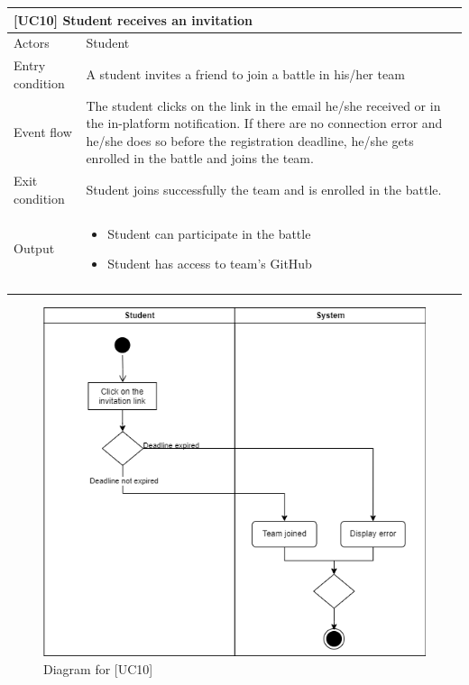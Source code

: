 \documentclass[12pt,oneside,a4paper]{article}
\begin{document}
\clearpage

\begin{table}[htbp]
\begin{tabular}{|l|p{12cm}|}
    \hline
    \multicolumn{2}{|l|}{\textbf{[UC10] Student receives an invitation}}\\
    \hline
    Actors & Student\\
    \hline
    Entry condition & A student invites a friend to join a battle in his/her team\\
    \hline
    Event flow & The student clicks on the link in the email he/she received or in the in-platform notification. If there are no connection error and he/she does so before the registration deadline, he/she gets enrolled in the battle and joins the team.\\
    \hline
    Exit condition & Student joins successfully the team and is enrolled in the battle.\\
    \hline
    Output & \begin{itemize}
        \item Student can participate in the battle
        \item Student has access to team's GitHub
    \end{itemize}\\
    \lasthline
\end{tabular}
\end{table}

\begin{figure}
    \centering
    \includegraphics[width=1\linewidth]{Images//Diagrams/StudentReceivesInvitation.png}
    \caption{Diagram for [UC10]}
    \label{fig:enter-label}
\end{figure}
\end{document}
